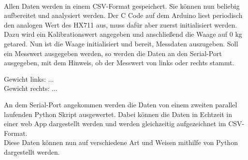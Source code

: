 \\
Allen Daten werden in einem CSV-Format gespeichert.
Sie können nun beliebig aufbereitet und analysiert werden.
Der C Code auf dem Arduino liest periodisch den analogen Wert des HX711 aus, muss dafür aber zuerst initialisiert werden.
Dazu wird ein Kalibrationswert angegeben und anschließend die Waage auf 0 kg getared.
Nun ist die Waage initialisiert und bereit, Messdaten auszugeben.
Soll ein Messwert ausgegeben werden, so werden die Daten an den Serial-Port ausgegeben, mit dem Hinweis, ob der Messwert von links oder rechts stammt.
\begin{center}
    Gewicht links: ...  \\
    Gewicht rechts: ...
\end{center}
An dem Serial-Port angekommen werden die Daten von einem zweiten parallel laufenden Python Skript ausgewertet.
Dabei können die Daten in Echtzeit in einer web App dargestellt werden und werden gleichzeitig aufgezeichnet im CSV-Format.
\\
Diese Daten können nun auf verschiedene Art und Weisen mithilfe von Python dargestellt werden.
